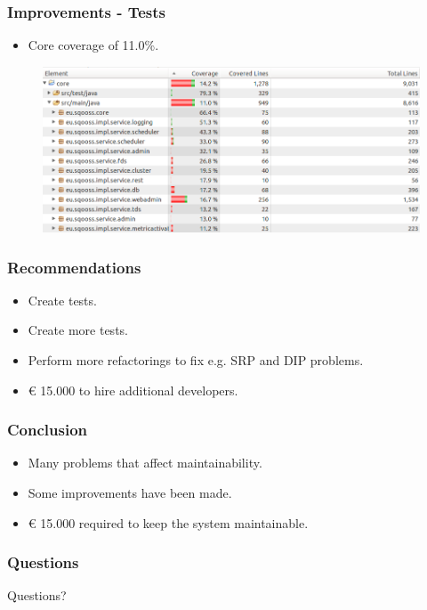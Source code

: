 \documentclass{beamer}
\begin{document}
\begin{frame}
    \frametitle{Improvements - Tests}
    \begin{itemize}
        \item Core coverage of 11.0\%.
    \end{itemize}
    
    \begin{figure}
    	\centering
    		\includegraphics[width=\textwidth]{../img/coreCoverageAfter.png}
    \end{figure}
\end{frame}

\begin{frame}
    \frametitle{Recommendations}
    \begin{itemize}
    		\item Create tests.
    		\item<2-> Create more tests.
    		\item<3-> Perform more refactorings to fix e.g. SRP and DIP problems.
    		\item<4-> $\euro{}$ 15.000 to hire additional developers.
    \end{itemize}
\end{frame}

\begin{frame}
    \frametitle{Conclusion}
    \begin{itemize}
    		\item Many problems that affect maintainability.
    		\item Some improvements have been made.
    		\item $\euro{}$ 15.000 required to keep the system maintainable.
    \end{itemize}
\end{frame}

\begin{frame}
    \frametitle{Questions}
    \hspace{.25\linewidth}
    \Huge{Questions?}
\end{frame}
\end{document}
